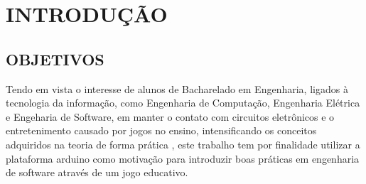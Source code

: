 
\chapter{INTRODUÇÃO}
\label{chap:introducao}


\section{OBJETIVOS}
\label{secobjetivos}

Tendo em vista o interesse de alunos de Bacharelado em Engenharia, ligados à tecnologia da informação, como Engenharia de Computação, Engenharia Elétrica e Engeharia de Software, em manter o contato com circuitos eletrônicos e o entretenimento causado por jogos no ensino, intensificando os conceitos adquiridos na teoria de forma prática \cite{thiry2010}, este trabalho tem por finalidade utilizar a plataforma arduino como motivação para introduzir boas práticas em engenharia de software através de um jogo educativo.